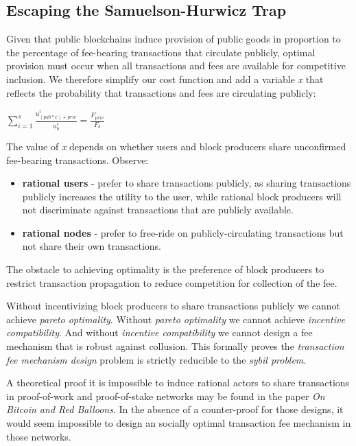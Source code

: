 \documentclass[oneside]{article}   	%
\begin{document}
\subsection*{Escaping the Samuelson-Hurwicz Trap}

Given that public blockchains induce provision of public goods in proportion to the percentage of fee-bearing transactions that circulate publicly, optimal provision must occur when all transactions and fees are available for competitive inclusion. We therefore simplify our cost function and add a variable \textit{x} that reflects the probability that transactions and fees are circulating publicly:

\LARGE
\begin{adjustwidth}{1.5em}{1.5em} 
\begin{math}
\sum_{i=1}^{s} \frac{u_{({pub}*{x})+{priv}}^i}{u_b^i} = \frac{F_{{priv}}}{F_b}
\end{math}
\end{adjustwidth}
\normalsize

The value of \textit{x} depends on whether users and block producers share unconfirmed fee-bearing transactions. Observe:

\begin{itemize}
  \item \textbf{rational users} - prefer to share transactions publicly, as sharing transactions publicly increases the utility to the user, while  rational block producers will not discriminate against transactions that are publicly available.
  \item \textbf{rational nodes} - prefer to free-ride on publicly-circulating transactions but not share their own transactions.
\end{itemize}

The obstacle to achieving optimality is the preference of block producers to restrict transaction propagation to reduce competition for collection of the fee.

Without incentivizing block producers to share transactions publicly we cannot achieve \textit{pareto optimality}. Without \textit{pareto optimality} we cannot achieve \textit{incentive compatibility}. And without \textit{incentive compatibility} we cannot design a fee mechanism that is robust against collusion. This formally proves the \textit{transaction fee mechanism design} problem is strictly reducible to the \textit{sybil problem}.

A theoretical proof it is impossible to induce rational actors to share transactions in proof-of-work and proof-of-stake networks may be found in the paper \textit{On Bitcoin and Red Balloons}. In the absence of a counter-proof for those designs, it would seem impossible to design an socially optimal transaction fee mechanism in those networks.
\end{document}
